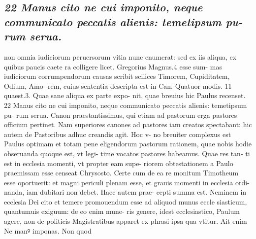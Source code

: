 \documentclass{article}
\begin{document}
\begin{pages}
\subsection*{\textit{22 Manus cito ne cui imponito, neque communicato peccatis alienis: temetipsum pu- rum serua.}}non omnia iudiciorum peruersorum vitia nunc enumerat: sed ex iis aliqua, ex quibus paucis caete ra colligere licet. Gregorius Magnus.4 esse sum- mas iudiciorum corrumpendorum causas scribit scilices Timorem, Cupiditatem, Odium, Amo- rem, cuius sententia descripta est in Can. Quatuor modis. 11 quaest.3. Quae sane aliqua ex parte expo- nit, quae breuius hic Paulus recenset. 22 Manus cito ne cui imponito, neque communicato peccatis alienis: temetipsum pu- rum serua. Canon praestantissimus, qui etiam ad pastorum erga pastores officium pertinet. Nam superiores canones ad pastores iam creatos spectabant: hic autem de Pastoribus adhuc creandis agit. Hoc v- no breuiter complexus est Paulus optimam et totam pene eligendorum pastorum rationem, quae nobis hodie obseruanda quoque est, vt legi- time vocatos pastores habeamus. Quae res tan- ti est in ecclesia momenti, vt propter eam supe- riorem obtestationem a Paulo praemissam esse censeat Chrysosto. Certe cum de ea re monitum Timotheum esse oportuerit: et magni periculi plenam esse, et grauis momenti in ecclesia ordi- nanda, iam dubitari non debet. Haec autem prae- cepti summa est. Neminem in ecclesia Dei cito et temere promouendum esse ad aliquod munus eccle siasticum, quantumuis exiguum: de eo enim mune- ris genere, idest ecclesiastico, Paulum agere, non de politicis Magistratibus apparet ex phrasi ipsa qua vtitur. Ait enim Ne manꝰ imponas. Non quod  \pend

\end{pages}
\end{document}
